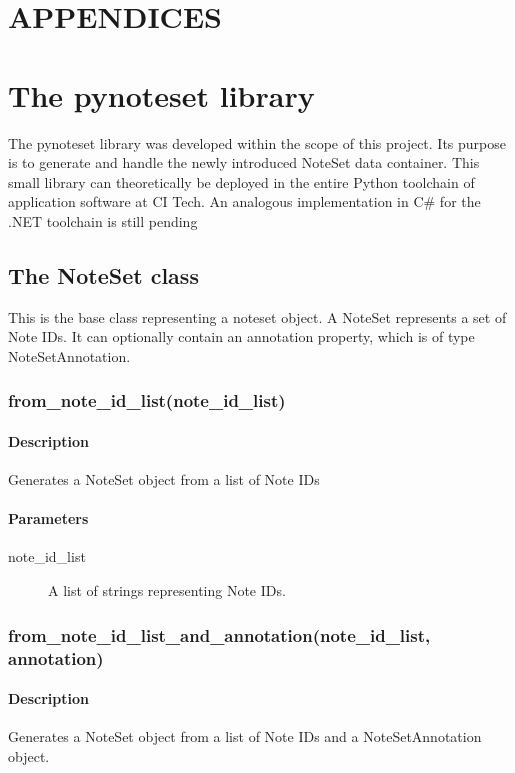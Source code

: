 \chapter*{APPENDICES}

\begingroup\let\clearpage\relax
\chapter{The pynoteset library}
\label{chap:appendix_pns}
\endgroup

The pynoteset library was developed within the scope of this project. Its purpose is to generate and handle the newly introduced NoteSet data container. This small library can theoretically be deployed in the entire Python toolchain of application software at CI Tech. An analogous implementation in C\# for the .NET toolchain is still pending

\section{The NoteSet class}
This is the base class representing a noteset object. A NoteSet represents a set of Note IDs. It can optionally contain an annotation property, which is of type NoteSetAnnotation.
\subsection{from\_note\_id\_list(note\_id\_list)}
\subsubsection{Description}
Generates a NoteSet object from a list of Note IDs
\subsubsection{Parameters}
\begin{description}
\item [note\_id\_list] A list of strings representing Note IDs.

\end{description}

\subsection{from\_note\_id\_list\_and\_annotation(note\_id\_list, annotation)}
\subsubsection{Description}
Generates a NoteSet object from a list of Note IDs and a NoteSetAnnotation object.
